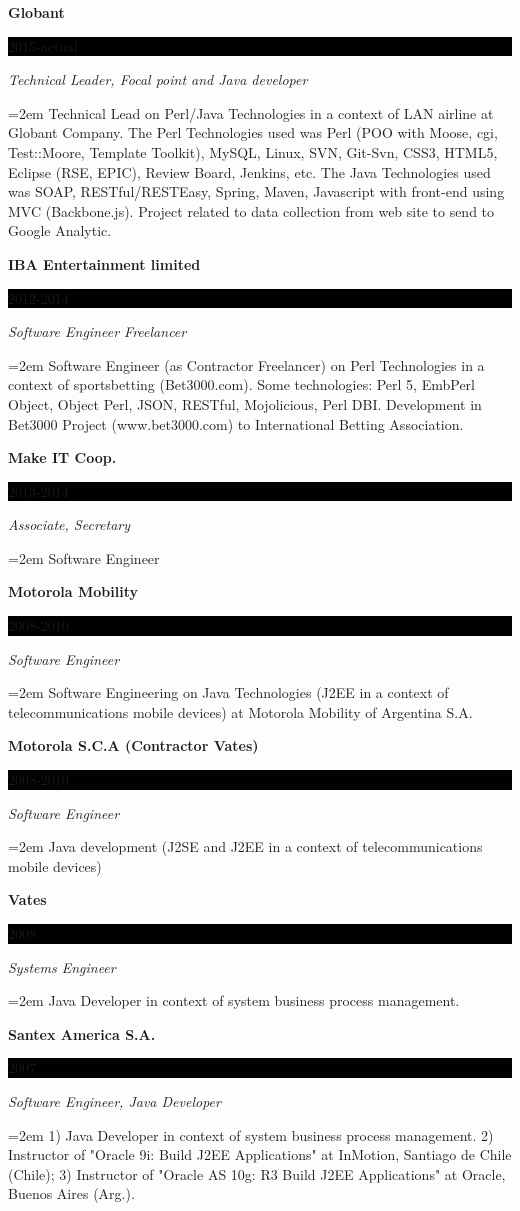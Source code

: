 \documentclass[paper=a4,fontsize=11pt]{scrartcl} %
\newcommand{\sepspace}{\vspace*{1em}}		%
\newcommand{\EducationEntry}[4]{
		\noindent \textbf{#1} \hfill      %
		\colorbox{Black}{%
			\parbox{6em}{%
			\hfill\color{White}#2}} \par  %
		\noindent \textit{#3} \par        %
		\noindent\hangindent=2em\hangafter=0 \small #4 %
		\normalsize \par}
\begin{document}
\EducationEntry{Globant}{2015-actual}{Technical Leader, Focal point and Java developer}
{Technical Lead on Perl/Java Technologies in a context of LAN airline at Globant Company. The Perl Technologies used was Perl (POO with Moose, cgi, Test::Moore, Template Toolkit), MySQL, Linux, SVN, Git-Svn, CSS3, HTML5, Eclipse (RSE, EPIC), Review Board, Jenkins, etc. The Java Technologies used was SOAP, RESTful/RESTEasy, Spring, Maven, Javascript with front-end using MVC (Backbone.js). Project related to data collection from web site to send to Google Analytic.}
\sepspace

\EducationEntry{IBA Entertainment limited}{2012-2014}{Software Engineer Freelancer}
{Software Engineer (as Contractor Freelancer) on Perl Technologies in a context of sportsbetting (Bet3000.com). Some technologies: Perl 5, EmbPerl Object, Object Perl, JSON, RESTful, Mojolicious, Perl DBI. Development in Bet3000 Project (www.bet3000.com) to International Betting Association.}
\sepspace

\EducationEntry{Make IT Coop.}{2013-2014}{Associate, Secretary}{
Software Engineer}
\sepspace

\EducationEntry{Motorola Mobility}{2008-2010}{Software Engineer}
{Software Engineering on Java Technologies (J2EE in a context of telecommunications mobile devices) at Motorola Mobility of Argentina S.A.}
\sepspace

\EducationEntry{Motorola S.C.A (Contractor Vates)}{2008-2010}{Software Engineer}
{Java development (J2SE and J2EE in a context of telecommunications mobile devices)}
\sepspace

\EducationEntry{Vates}{2008}{Systems Engineer}
{Java Developer in context of system business process management.}
\sepspace

\EducationEntry{Santex America S.A.}{2007}{Software Engineer, Java Developer}
{1) Java Developer in context of system business process management. 2) Instructor of "Oracle 9i: Build J2EE Applications" at InMotion, Santiago de Chile (Chile);
3) Instructor of "Oracle AS 10g: R3 Build J2EE Applications" at Oracle, Buenos Aires (Arg.).}
\sepspace
\end{document}
